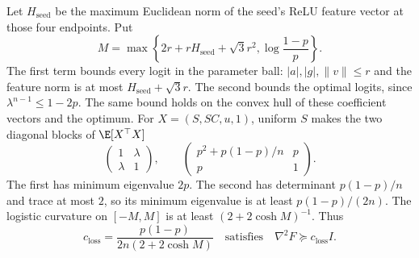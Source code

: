Let $H_{\mathrm{seed}}$ be the maximum Euclidean norm of the seed's ReLU feature
vector at those four endpoints. Put
\[
 M=\max\left\{2r+rH_{\mathrm{seed}}+\sqrt3r^2,
                \log\frac{1-p}{p}\right\}.
\]
The first term bounds every logit in the parameter ball: $|a|,|g|,\|v\|\le r$
and the feature norm is at most $H_{\mathrm{seed}}+\sqrt3r$.
The second bounds the optimal logits, since $\lambda^{n-1}\le1-2p$.
The same bound holds on the convex hull of these coefficient vectors and the optimum.
For $X=(S,SC,u,1)$, uniform $S$ makes the two diagonal blocks of $\E[X^\top X]$
\[
 \begin{pmatrix}1&\lambda\\\lambda&1\end{pmatrix},\qquad
 \begin{pmatrix}p^2+p(1-p)/n&p\\p&1\end{pmatrix}.
\]
The first has minimum eigenvalue $2p$. The second has determinant $p(1-p)/n$
and trace at most $2$, so its minimum eigenvalue is at least $p(1-p)/(2n)$.
The logistic curvature on $[-M,M]$ is at least $(2+2\cosh M)^{-1}$. Thus
\begin{equation}
 c_{\mathrm{loss}}=\frac{p(1-p)}{2n(2+2\cosh M)}
 \quad\text{satisfies}\quad \nabla^2F\succeq c_{\mathrm{loss}}I.
 \label{eq:random-trap-loss}
\end{equation}

